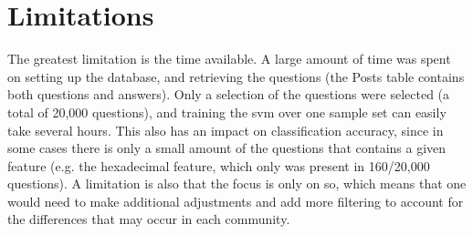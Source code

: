 \begin{comment}
The quality of a question is based on the votes given by the users of the StackOverflow community. 
Therefore the vote score was used to label the question as either good (score > 0) or bad (score < 0). 
This is justified by the fact that you can draw a comparison between the peer-review process used in academia and the peer-review process used in StackOverflow. 
The process starts with someone posting a question, which is then read, scored and given feedback (through comments or answers). 
The feedback can then improve the question through edits by the poster, based on the feedback given 
(e.g. adding additional information or explaining how the given problem(s) occurred).
\vspace{0.5em}\newline
Scikit-learns \gls{svm} implementation is based on libsvm \cite{ChangLin2011}, but it is simpler to use. 
In addition, scikit-learn focuses on code quality\footnote{Coverage on their GitHub repository was 94\% on 06. May 2015.}, 
to ensure that everything works as it should \cite[p.~3]{PedregosaVaroquauxGramfortEtAl2011}.
\vspace{0.5em}\newline
It is not a lot of research being done related to asking and defining good questions. 
Although the focus is only on programming questions, it can still be useful to improve question quality. 
Even if you cannot predict if it is a good question, you can still avoid asking a bad questions. 
This in turn can help to improve the question quality (at least acceptability), and avoid asking questions that will be closed or ignored on StackOverflow.
\end{comment}

\section{Limitations}
\label{sec:limitations}
The greatest limitation is the time available. 
A large amount of time was spent on setting up the database, and retrieving the questions (the Posts table contains both questions and answers).
Only a selection of the questions were selected (a total of 20,000 questions), and training the \gls{svm} over one sample set can easily take several hours. 
This also has an impact on classification accuracy, since in some cases there is only a small amount of the questions that contains a given feature 
(e.g. the hexadecimal feature, which only was present in 160/20,000 questions).
A limitation is also that the focus is only on \gls{so}, which means that one would need to make additional adjustments and add more filtering to account 
for the differences that may occur in each community.
 

